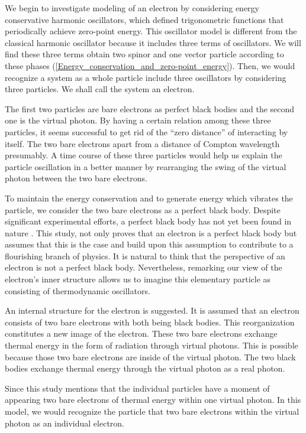 \documentclass[%
 reprint,
 amsmath,amssymb,
 aps,
]{revtex4-1}
\numberwithin{equation}{section}%
\begin{document}
    We begin to investigate modeling of an electron by considering energy conservative harmonic oscillators, which defined trigonometric functions that periodically achieve zero-point energy. This oscillator model is different from the classical harmonic oscillator because it includes three terms of oscillators. We will find these three terms obtain two spinor and one vector particle according to these phases (\ref{Energy_conservation_and_zero-point_energy}). Then, we would recognize a system as a whole particle include three oscillators by considering three particles. We shall call the system an electron.
    
    The first two particles are bare electrons as perfect black bodies and the second one is the virtual photon. By having a certain relation among these three particles, it seems successful to get rid of the ``zero distance'' of interacting by itself. The two bare electrons apart from a distance of Compton wavelength presumably. A time course of these three particles would help us explain the particle oscillation in a better manner by rearranging the swing of the virtual photon between the two bare electrons.

    To maintain the energy conservation and to generate energy which vibrates the particle, we consider the two bare electrons as a perfect black body. Despite significant experimental efforts, a perfect black body \cite{Planck} has not yet been found in nature \cite{Zu-Po Yang}. This study, not only proves that an electron is a perfect black body but assumes that this is the case and build upon this assumption to contribute to a flourishing branch of  physics. It is natural to think that the perspective of an electron is not a perfect black body. Nevertheless, remarking our view of the electron's inner structure allows us to imagine this elementary particle as consisting of thermodynamic oscillators.
        
    An internal structure for the electron is suggested. It is assumed that an electron consists of two bare electrons with both being black bodies. This reorganization constitutes a new image of the electron. These two bare electrons exchange thermal energy in the form of radiation through virtual photons. This is possible because those two bare electrons are inside of the virtual photon. The two black bodies exchange thermal energy through the virtual photon as a real photon.

    Since this study mentions that the individual particles have a moment of appearing two bare electrons of thermal energy within one virtual photon. In this model, we would recognize the particle that two bare electrons within the virtual photon as an individual electron.
        
\end{document}
